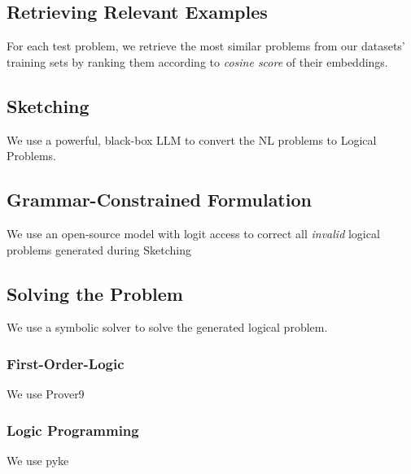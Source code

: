\documentclass[conference]{IEEEtran}
\begin{document}
\subsection{Retrieving Relevant Examples}
For each test problem, we retrieve the most similar problems from our datasets' training sets 
by ranking them according to \textit{cosine score} of their embeddings.

\subsection{Sketching}
We use a powerful, black-box LLM to convert the NL problems to Logical Problems.

\subsection{Grammar-Constrained Formulation}
We use an open-source model with logit access to correct all \textit{invalid} logical problems
generated during Sketching



\subsection{Solving the Problem}
We use a symbolic solver to solve the generated logical problem.

\subsubsection*{First-Order-Logic}
We use Prover9

\subsubsection*{Logic Programming}
We use pyke
\end{document}
